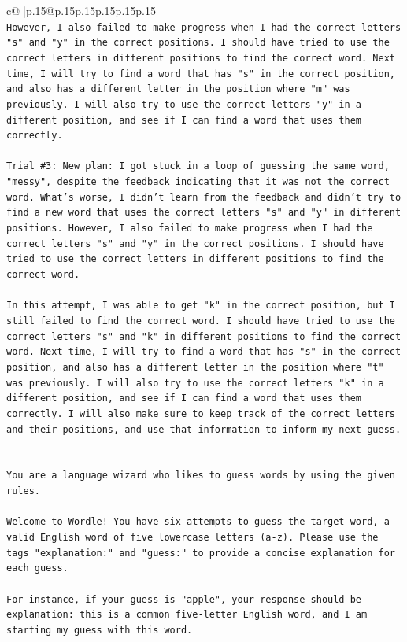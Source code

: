 \documentclass{article}
\begin{document}
{\begin{supertabular}{c@{$\;$}|p{.15\linewidth}@{}p{.15\linewidth}p{.15\linewidth}p{.15\linewidth}p{.15\linewidth}p{.15\linewidth}}
{{{\\ 
\texttt{However, I also failed to make progress when I had the correct letters "s" and "y" in the correct positions. I should have tried to use the correct letters in different positions to find the correct word. Next time, I will try to find a word that has "s" in the correct position, and also has a different letter in the position where "m" was previously. I will also try to use the correct letters "y" in a different position, and see if I can find a word that uses them correctly.} \\
\\ 
\texttt{Trial \#3: New plan: I got stuck in a loop of guessing the same word, "messy", despite the feedback indicating that it was not the correct word. What's worse, I didn't learn from the feedback and didn't try to find a new word that uses the correct letters "s" and "y" in different positions. However, I also failed to make progress when I had the correct letters "s" and "y" in the correct positions. I should have tried to use the correct letters in different positions to find the correct word. } \\
\\ 
\texttt{In this attempt, I was able to get "k" in the correct position, but I still failed to find the correct word. I should have tried to use the correct letters "s" and "k" in different positions to find the correct word. Next time, I will try to find a word that has "s" in the correct position, and also has a different letter in the position where "t" was previously. I will also try to use the correct letters "k" in a different position, and see if I can find a word that uses them correctly. I will also make sure to keep track of the correct letters and their positions, and use that information to inform my next guess.} \\
\\ 
\\ 
\texttt{You are a language wizard who likes to guess words by using the given rules.} \\
\\ 
\texttt{Welcome to Wordle! You have six attempts to guess the target word, a valid English word of five lowercase letters (a{-}z). Please use the tags "explanation:" and "guess:" to provide a concise explanation for each guess.} \\
\\ 
\texttt{For instance, if your guess is "apple", your response should be} \\
\texttt{explanation: this is a common five{-}letter English word, and I am starting my guess with this word.} \\
}}}
\end{supertabular}}
\end{document}
